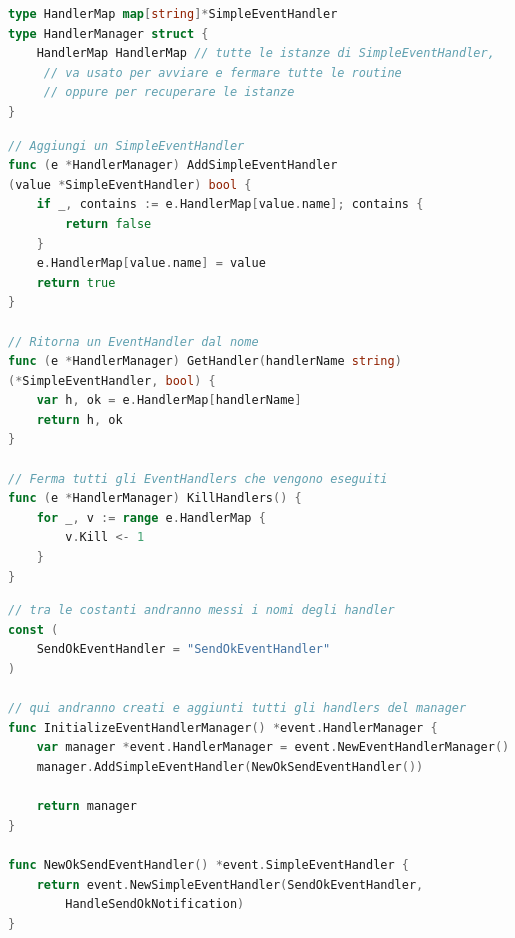 \documentclass[main.tex]{subfiles}
\begin{document}
\begin{lstlisting}[language=go]
type HandlerMap map[string]*SimpleEventHandler
type HandlerManager struct {
    HandlerMap HandlerMap // tutte le istanze di SimpleEventHandler, 
     // va usato per avviare e fermare tutte le routine 
     // oppure per recuperare le istanze
}
\end{lstlisting}
\begin{lstlisting}[language=go]
// Aggiungi un SimpleEventHandler
func (e *HandlerManager) AddSimpleEventHandler
(value *SimpleEventHandler) bool {
	if _, contains := e.HandlerMap[value.name]; contains {
		return false
	}
	e.HandlerMap[value.name] = value
	return true
}

// Ritorna un EventHandler dal nome
func (e *HandlerManager) GetHandler(handlerName string) 
(*SimpleEventHandler, bool) {
	var h, ok = e.HandlerMap[handlerName]
	return h, ok
}

// Ferma tutti gli EventHandlers che vengono eseguiti
func (e *HandlerManager) KillHandlers() {
	for _, v := range e.HandlerMap {
		v.Kill <- 1
	}
}
\end{lstlisting}
\begin{lstlisting}[language=go]
// tra le costanti andranno messi i nomi degli handler
const (
	SendOkEventHandler = "SendOkEventHandler"
)

// qui andranno creati e aggiunti tutti gli handlers del manager
func InitializeEventHandlerManager() *event.HandlerManager {
	var manager *event.HandlerManager = event.NewEventHandlerManager()
	manager.AddSimpleEventHandler(NewOkSendEventHandler())

	return manager
}

func NewOkSendEventHandler() *event.SimpleEventHandler {
	return event.NewSimpleEventHandler(SendOkEventHandler, 
        HandleSendOkNotification)
}
\end{lstlisting}
\end{document}
